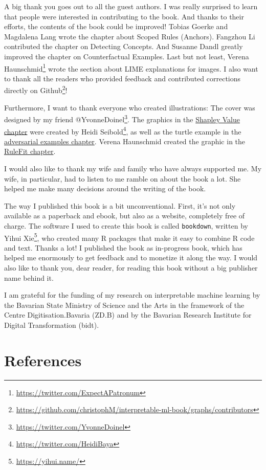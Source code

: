 \documentclass[
  10pt,
]{scrbook}
\renewcommand{\href}[2]{#2\footnote{\url{#1}}}
\begin{document}
A big thank you goes out to all the guest authors.
I was really surprised to learn that people were interested in contributing to the book.
And thanks to their efforts, the contents of the book could be improved!
Tobias Goerke and Magdalena Lang wrote the chapter about Scoped Rules (Anchors).
Fangzhou Li contributed the chapter on Detecting Concepts.
And Susanne Dandl greatly improved the chapter on Counterfactual Examples.
Last but not least, \href{https://twitter.com/ExpectAPatronum}{Verena Haunschmid} wrote the section about LIME explanations for images.
I also want to thank all the readers who provided feedback and contributed corrections directly \href{https://github.com/christophM/interpretable-ml-book/graphs/contributors}{on Github}!

Furthermore, I want to thank everyone who created illustrations:
The cover was designed by my friend \href{https://twitter.com/YvonneDoinel}{@YvonneDoinel}.
The graphics in the \protect\hyperlink{shapley}{Shapley Value chapter} were created by \href{https://twitter.com/HeidiBaya}{Heidi Seibold}, as well as the turtle example in the \protect\hyperlink{adversarial}{adversarial examples chapter}.
Verena Haunschmid created the graphic in the \protect\hyperlink{rulefit}{RuleFit chapter}.

I would also like to thank my wife and family who have always supported me.
My wife, in particular, had to listen to me ramble on about the book a lot.
She helped me make many decisions around the writing of the book.

The way I published this book is a bit unconventional.
First, it's not only available as a paperback and ebook, but also as a website, completely free of charge.
The software I used to create this book is called \texttt{bookdown}, written by \href{https://yihui.name/}{Yihui Xie}, who created many R packages that make it easy to combine R code and text.
Thanks a lot!
I published the book as in-progress book, which has helped me enormously to get feedback and to monetize it along the way.
I would also like to thank you, dear reader, for reading this book without a big publisher name behind it.

I am grateful for the funding of my research on interpretable machine learning by the Bavarian State Ministry of Science and the Arts in the framework of the Centre Digitisation.Bavaria (ZD.B) and by the Bavarian Research Institute for Digital Transformation (bidt).

\hypertarget{references}{%
\chapter*{References}\label{references}}
\end{document}

